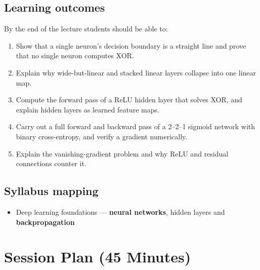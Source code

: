 \documentclass[11pt]{article}
\begin{document}
\subsection*{Learning outcomes}By the end of the lecture students should be able to:\begin{enumerate}\item Show that a single neuron's decision boundary is a straight line and prove that no single neuron computes XOR.\item Explain why wide-but-linear and stacked linear layers collapse into one linear map.\item Compute the forward pass of a ReLU hidden layer that solves XOR, and explain hidden layers as learned feature maps.\item Carry out a full forward and backward pass of a 2--2--1 sigmoid network with binary cross-entropy, and verify a gradient numerically.\item Explain the vanishing-gradient problem and why ReLU and residual connections counter it.\end{enumerate}

\subsection*{Syllabus mapping}\begin{itemize}\item Deep learning foundations --- \textbf{neural networks}, hidden layers and \textbf{backpropagation}\end{itemize}

\section{Session Plan (45 Minutes)}
\end{document}
